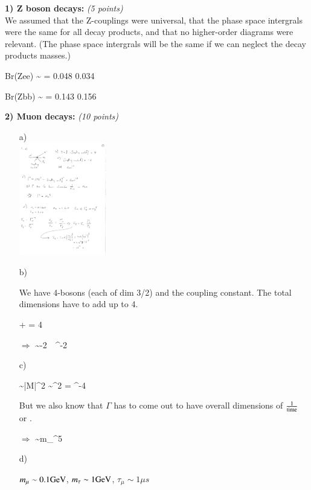 {\large

\textbf{1) Z boson decays: } \hfill \textit{(5 points)}\\

We assumed that the Z-couplings were universal, that the phase space intergrals were the same for all decay products, and that no higher-order diagrams were relevant. 
(The phase space intergrals will be the same if we can neglect the decay products masses.)

\be
Br(Z\rightarrow ee) \sim {} = 0.048  0.034  
\ee

\be
Br(Z\rightarrow bb) \sim {} = 0.143  0.156  
\ee


\textbf{2) Muon decays: } \hfill \textit{(10 points)}\\
\begin{itemize}
\item[a)]{ ${ }$\\
\bc
\includegraphics[width=0.3\textwidth]{./4pointInteraction.pdf}
\ec
}

\item[b)]{ We have 4-bosons (each of dim 3/2)  and the coupling constant.  The total dimensions have to add up to 4. 

 \times {} +  = 4
\ee

$\Rightarrow$
\be
  \sim  -2\ \ \GeV^{-2}
\ee

}

\item[c)]{ 

\be
\Gamma \sim |M|^2 \sim  {}^2 = \GeV^{-4}
\ee
}
But we also know that $\Gamma$ has to come out to have overall dimensions of $\frac{1}{\textrm{time}}$ or \GeV.

$\Rightarrow$  
\be
\Gamma \sim m_\mu^5
\ee

\item[d)]{
$m_\mu \sim 0.1 \textrm{GeV}$, $m_\tau \sim 1 \textrm{GeV}$, $\tau_\mu \sim 1\mu s$

}
\end{itemize}}
